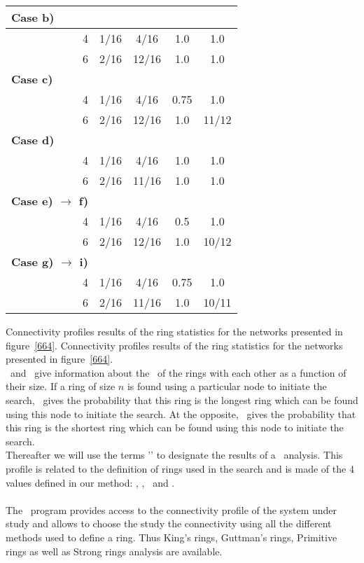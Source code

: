 {\begin{tabular}{cr|cccc}
\hline
\multicolumn{2}{l}{\bf{Case b)}} \\ 
\hline
 & 4\hspace{0.25cm} & 1/16 &  4/16 & 1.0 & 1.0 \\
 & 6\hspace{0.25cm} & 2/16 & 12/16 & 1.0 & 1.0
\\
\hline
\multicolumn{2}{l}{\bf{Case c)}} \\ 
\hline
 & 4\hspace{0.25cm} & 1/16 &  4/16 & 0.75 & 1.0 \\
 & 6\hspace{0.25cm} & 2/16 & 12/16 & 1.0  & 11/12 
\\
\hline
\multicolumn{2}{l}{\bf{Case d)}} \\ 
\hline
 & 4\hspace{0.25cm} & 1/16 &  4/16 & 1.0 & 1.0 \\
 & 6\hspace{0.25cm} & 2/16 & 11/16 & 1.0 & 1.0
\\
\hline
\multicolumn{2}{l}{\bf{Case e) $\to$ f)}} \\ 
\hline
 & 4\hspace{0.25cm} & 1/16 &  4/16 & 0.5 & 1.0 \\
 & 6\hspace{0.25cm} & 2/16 & 12/16 & 1.0 & 10/12
\\
\hline
\multicolumn{2}{l}{{\bf{Case g) $\to$ i)}}} \\ 
\hline
 & 4\hspace{0.25cm} & 1/16 &  4/16 & 0.75 & 1.0 \\
 & 6\hspace{0.25cm} & 2/16 & 11/16 &  1.0 & 10/11
\end{tabular}}
{Connectivity profiles results of the ring statistics for the networks presented in figure~\ref{664}.}
{Connectivity profiles results of the ring statistics for the networks presented in figure~\ref{664}.}
\\ \pmax\ and \pmin\ give information about the \con\ of the rings with each other as a function of their size. 
If a ring of size $n$ is found using a particular node to initiate the search, \pmax\ gives the probability that this ring is the longest ring which can be found using this node to initiate the search. 
At the opposite, \pmin\ gives the probability that this ring is the shortest ring which can be found using this node to initiate the search. \\
Thereafter we will use the terms '\conp' to designate the results of a \rstat\ analysis. 
This profile is related to the definition of rings used in the search and is made of the 4 values defined in our method: \rpc, \pnr, \pmax\ and \pmin. \\
\\
The \atomes\ program provides access to the connectivity profile of the system under study and allows to choose the study the connectivity using all the different methods used to define a ring. Thus King's rings, Guttman's rings, Primitive rings as well as Strong rings analysis are available.
\clearpage
